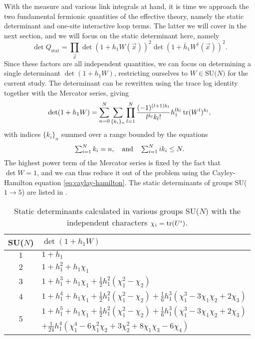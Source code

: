 With the measure and various link integrals at hand, it is time we approach the
two fundamental fermionic quantities of the effective theory, namely the static
determinant and one-site interactive loop terms. The latter we will cover in the
next section, and we will focus on the static determinant here, namely
%
\begin{equation}
  \det Q_{\text{stat}} = \prod_{\vec{x}} \det ( 1 + h_1 W(\vec{x}) )^2 
    \det ( 1 + \bar{h}_1 W^{\dagger}(\vec{x}) )^2.
\end{equation}
%
Since these factors are all independent quantities, we can focus on determining
a single determinant $\det(1 + h_1 W)$, restricting ourselves to $W \in
\text{SU($N$)}$ for the current study. The determinant can be rewritten using the
trace log identity together with the Mercator series, giving
%
\begin{equation}
  \det ( 1 + h_1 W ) = \sum_{n=0}^N \sum_{\{k_i\}_n} \prod_{l=1}^N
  \frac{(-1)^{(l+1)k_l}}{l^{k_l} k_l!} h_1^{l k_l} \operatorname{tr} (W^l)^{k_l},
\end{equation}
%
with indices $\{k_i\}_n$ summed over a range bounded by the equations
%
\begin{equation} \textstyle
  \sum_{i=1}^{N} k_i = n, \hskip1em\text{and}\hskip1em
  \sum_{i=1}^N i k_i \leq N .
\end{equation}
%
The highest power term of the Mercator series is fixed by the fact that $\det W
= 1$, and we can thus reduce it out of the problem using the Cayley-Hamilton
equation \eqref{eq:caylay-hamilton}. The static determinants of groups SU($1 \to
5$) are listed in .

\begin{table}
  \begin{center}
    \begin{tabular}{cl} \toprule
      SU($N$) & $\det(1 + h_1 W)$ \\ \midrule
      $1$ & $1 + h_1$ \\
      $2$ & $1 + h_1^2 + h_1 \chi_1$ \\
      $3$ & $1 + h_1^3 + h_1\chi_1 + \frac{1}{2} h_1^2 (\chi_1^2 - \chi_2)$ \\
      $4$ & $1 + h_1^4 + h_1 \chi_1 + \frac{1}{2} h_1^2 (\chi_1^2 - \chi_2) +
      \frac{1}{6} h_1^3 (\chi_1^3 - 3 \chi_1 \chi_2 + 2 \chi_3)$ \\
      \multirow{2}{*}{$5$} & $1 + h_1^5 + h_1 \chi_1 + \frac{1}{2} h_1^2 (\chi_1^2 - \chi_2) +
      \frac{1}{6} h_1^3 (\chi_1^3 - 3 \chi_1 \chi_2 + 2 \chi_3) $ \\
      & $ + \frac{1}{24} h_1^4 ( \chi_1^4 - 6 \chi_1^2 \chi_2 + 3 \chi_2^2 +
      8\chi_1 \chi_3 - 6\chi_4 )$ \\ \bottomrule
    \end{tabular}
  \end{center}
  \caption{Static determinants calculated in various groups SU($N$) with the
    independent characters $\chi_i = \operatorname{tr}(U^i)$.}
  \label{tab:static-determinant}
\end{table}

